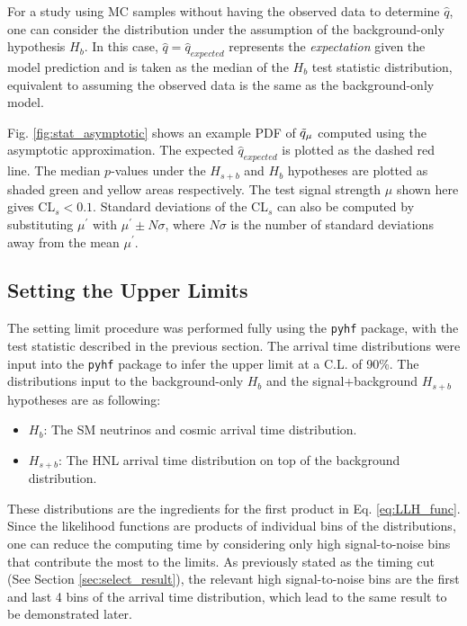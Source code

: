 For a study using MC samples without having the observed data to determine $\hat{q}$, one can consider the distribution under the assumption of the background-only hypothesis $H_b$.
In this case, $\hat{q} = \hat{q}_{expected}$ represents the \textit{expectation} given the model prediction and is taken as the median of the $H_b$ test statistic distribution, equivalent to assuming the observed data is the same as the background-only model. 

Fig. \ref{fig:stat_asymptotic} shows an example PDF of $\Tilde{q}_\mu$ computed using the asymptotic approximation.
The expected $\hat{q}_{expected}$ is plotted as the dashed red line. 
The median $p$-values under the $H_{s+b}$ and $H_b$ hypotheses are plotted as shaded green and yellow areas respectively.
The test signal strength $\mu$ shown here gives CL$_s < 0.1$.
Standard deviations of the CL$_s$ can also be computed by substituting $\mu^\prime$ with $\mu^{\prime} \pm N\sigma$, where $N\sigma$ is the number of standard deviations away from the mean $\mu^{\prime}$. 

\subsection{Setting the Upper Limits}
\label{sec:set_limits}

The setting limit procedure was performed fully using the \texttt{pyhf} package, with the test statistic described in the previous section.
The arrival time distributions were input into the \texttt{pyhf} package to infer the upper limit at a C.L. of 90\%.
The distributions input to the background-only $H_{b}$ and the signal+background $H_{s+b}$ hypotheses are as following:
\begin{itemize}
    \item $H_b$: The SM neutrinos and cosmic arrival time distribution.
    \item $H_{s+b}$: The HNL arrival time distribution on top of the background distribution. 
\end{itemize}

These distributions are the ingredients for the first product in Eq. \ref{eq:LLH_func}.
Since the likelihood functions are products of individual bins of the distributions, one can reduce the computing time by considering only high signal-to-noise bins that contribute the most to the limits. 
As previously stated as the timing cut (See Section \ref{sec:select_result}), the relevant high signal-to-noise bins are the first and last 4 bins of the arrival time distribution, which lead to the same result to be demonstrated later.

